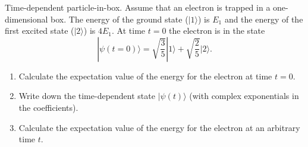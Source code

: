 \begin{aproblem}{Time-dependent particle-in-box.}   
  Assume that an electron is trapped in a one-dimensional box. The
  energy of the ground state ($|1\rangle$) is $E_1$ and the energy of
  the first excited state ($|2\rangle$) is $4E_1$.  At time $t=0$ the
  electron is in the state
  \[ |\psi(t=0)\rangle = \sqrt{\frac{3}{5}}|1\rangle 
  + \sqrt{\frac{2}{5}}|2\rangle.
  \]
  
  \begin{enumerate}
  \item Calculate the expectation value of the energy for the electron
    at time $t=0$.
  \item Write down the time-dependent state $|\psi(t)\rangle$ (with
    complex exponentials in the coefficients).
  \item Calculate the expectation value of the energy for the electron
    at an arbitrary time $t$.
  \end{enumerate}
  \label{prob:timedependence_1}
\end{aproblem}


